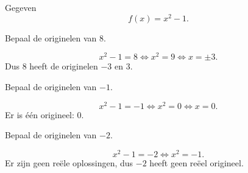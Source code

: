 \documentclass{ximera}
\begin{document}
\begin{oefening}[Originelen]{\oefB\ESS}

Gegeven
\[
f(x)=x^2-1.
\]

\begin{question}
Bepaal de originelen van \(8\).

\begin{oplossing}
\[
x^2-1=8
\Longleftrightarrow x^2=9
\Longleftrightarrow x=\pm3.
\]
Dus \(8\) heeft de originelen \(-3\) en \(3\).
\end{oplossing}
\end{question}

\begin{question}
Bepaal de originelen van \(-1\).

\begin{oplossing}
\[
x^2-1=-1\Longleftrightarrow x^2=0\Longleftrightarrow x=0.
\]
Er is één origineel: \(0\).
\end{oplossing}
\end{question}

\begin{question}
Bepaal de originelen van \(-2\).

\begin{oplossing}
\[
x^2-1=-2\Longleftrightarrow x^2=-1.
\]
Er zijn geen reële oplossingen, dus \(-2\) heeft geen reëel origineel.
\end{oplossing}
\end{question}

\end{oefening}
\end{document}

